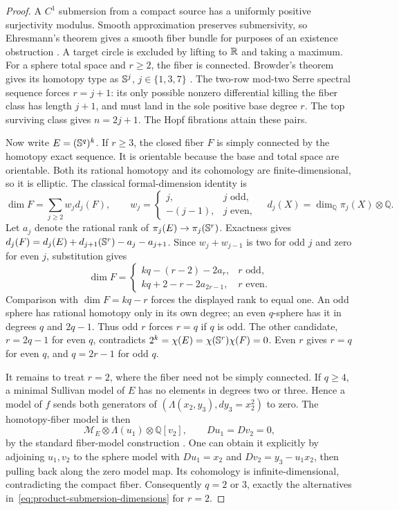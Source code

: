 \begin{proof}
A $C^1$ submersion from a compact source has a uniformly positive
surjectivity modulus. Smooth approximation preserves submersivity, so
Ehresmann's theorem gives a smooth fiber bundle for purposes of an
existence obstruction \cite{Ehresmann1952}. A target circle is excluded
by lifting to $\mathbb R$ and taking a maximum. For a sphere total space and
$r\geq2$, the fiber is connected. Browder's theorem gives its homotopy
type as $\mathbb S^j$, $j\in\{1,3,7\}$ \cite[Theorem~1]{Browder1962}.
The two-row mod-two Serre spectral sequence forces $r=j+1$: its only
possible nonzero differential killing the fiber class has length $j+1$,
and must land in the sole positive base degree $r$. The top surviving
class gives $n=2j+1$. The Hopf fibrations attain these pairs.

Now write $E=(\mathbb S^q)^k$. If $r\geq3$, the closed fiber $F$ is simply
connected by the homotopy exact sequence. It is orientable because the
base and total space are orientable. Both its rational homotopy and its
cohomology are finite-dimensional, so it is elliptic. The classical
formal-dimension identity \cite[Theorem~32.6]{FHT2001} is
\[
 \dim F=\sum_{j\geq2}w_jd_j(F),\qquad
 w_j=\begin{cases}j,&j\text{ odd},\\-(j-1),&j\text{ even},\end{cases}
 \quad d_j(X)=\dim_{\mathbb Q}\pi_j(X)\otimes\mathbb Q.
\]
Let $a_j$ denote the rational rank of $\pi_j(E)\to\pi_j(\mathbb S^r)$.
Exactness gives
$d_j(F)=d_j(E)+d_{j+1}(\mathbb S^r)-a_j-a_{j+1}$.
Since $w_j+w_{j-1}$ is two for odd $j$ and zero for even $j$, substitution
gives
\[
 \dim F=\begin{cases}
 kq-(r-2)-2a_r,&r\text{ odd},\\
 kq+2-r-2a_{2r-1},&r\text{ even}.
 \end{cases}
\]
Comparison with $\dim F=kq-r$ forces the displayed rank to equal one.
An odd sphere has rational homotopy only in its own degree; an even
$q$-sphere has it in degrees $q$ and $2q-1$. Thus odd $r$ forces $r=q$
if $q$ is odd. The other candidate, $r=2q-1$ for even $q$, contradicts
$2^k=\chi(E)=\chi(\mathbb S^r)\chi(F)=0$.
Even $r$ gives $r=q$ for even $q$, and $q=2r-1$ for odd $q$.

It remains to treat $r=2$, where the fiber need not be simply connected.
If $q\geq4$, a minimal Sullivan model of $E$ has no elements in degrees
two or three. Hence a model of $f$ sends both generators of
$(\Lambda(x_2,y_3),dy_3=x_2^2)$ to zero. The homotopy-fiber model is then
\[
 \mathcal M_E\otimes\Lambda(u_1)\otimes\mathbb Q[v_2],
 \qquad Du_1=Dv_2=0,
\]
by the standard fiber-model construction \cite[Section~15]{FHT2001}.
One can obtain it explicitly by adjoining $u_1,v_2$ to the sphere model
with $Du_1=x_2$ and $Dv_2=y_3-u_1x_2$, then pulling back along the zero
model map. Its cohomology is infinite-dimensional, contradicting the
compact fiber. Consequently $q=2$ or $3$, exactly the alternatives
in~\eqref{eq:product-submersion-dimensions} for $r=2$.
\end{proof}

